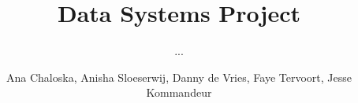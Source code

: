 \documentclass[sigconf]{acmart}
\begin{document}
\title{Data Systems Project}
\subtitle{...}

\author{Ana Chaloska, Anisha Sloeserwij, Danny de Vries, Faye Tervoort, Jesse Kommandeur}

\begin{abstract}
    
\end{abstract}


\maketitle
\pagestyle{plain} %





\end{document}
